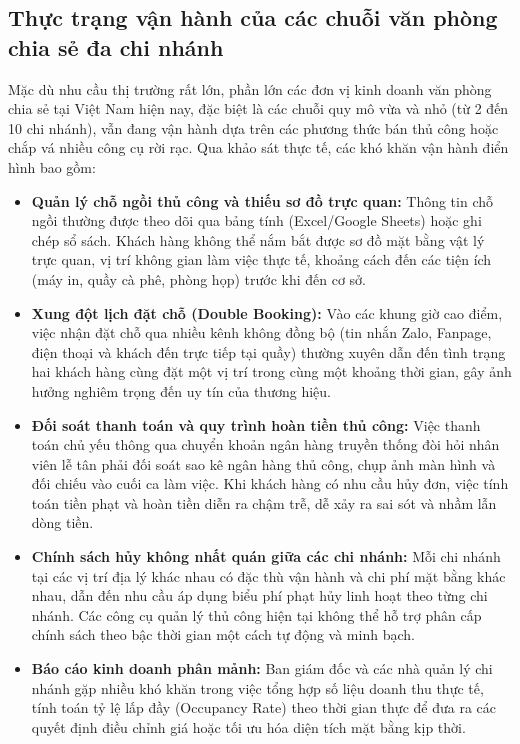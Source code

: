 \subsection{Thực trạng vận hành của các chuỗi văn phòng chia sẻ đa chi nhánh}
Mặc dù nhu cầu thị trường rất lớn, phần lớn các đơn vị kinh doanh văn phòng chia sẻ tại Việt Nam hiện nay, đặc biệt là các chuỗi quy mô vừa và nhỏ (từ 2 đến 10 chi nhánh), vẫn đang vận hành dựa trên các phương thức bán thủ công hoặc chắp vá nhiều công cụ rời rạc. Qua khảo sát thực tế, các khó khăn vận hành điển hình bao gồm:
\begin{itemize}
    \item \textbf{Quản lý chỗ ngồi thủ công và thiếu sơ đồ trực quan:} Thông tin chỗ ngồi thường được theo dõi qua bảng tính (Excel/Google Sheets) hoặc ghi chép sổ sách. Khách hàng không thể nắm bắt được sơ đồ mặt bằng vật lý trực quan, vị trí không gian làm việc thực tế, khoảng cách đến các tiện ích (máy in, quầy cà phê, phòng họp) trước khi đến cơ sở.
    \item \textbf{Xung đột lịch đặt chỗ (Double Booking):} Vào các khung giờ cao điểm, việc nhận đặt chỗ qua nhiều kênh không đồng bộ (tin nhắn Zalo, Fanpage, điện thoại và khách đến trực tiếp tại quầy) thường xuyên dẫn đến tình trạng hai khách hàng cùng đặt một vị trí trong cùng một khoảng thời gian, gây ảnh hưởng nghiêm trọng đến uy tín của thương hiệu.
    \item \textbf{Đối soát thanh toán và quy trình hoàn tiền thủ công:} Việc thanh toán chủ yếu thông qua chuyển khoản ngân hàng truyền thống đòi hỏi nhân viên lễ tân phải đối soát sao kê ngân hàng thủ công, chụp ảnh màn hình và đối chiếu vào cuối ca làm việc. Khi khách hàng có nhu cầu hủy đơn, việc tính toán tiền phạt và hoàn tiền diễn ra chậm trễ, dễ xảy ra sai sót và nhầm lẫn dòng tiền.
    \item \textbf{Chính sách hủy không nhất quán giữa các chi nhánh:} Mỗi chi nhánh tại các vị trí địa lý khác nhau có đặc thù vận hành và chi phí mặt bằng khác nhau, dẫn đến nhu cầu áp dụng biểu phí phạt hủy linh hoạt theo từng chi nhánh. Các công cụ quản lý thủ công hiện tại không thể hỗ trợ phân cấp chính sách theo bậc thời gian một cách tự động và minh bạch.
    \item \textbf{Báo cáo kinh doanh phân mảnh:} Ban giám đốc và các nhà quản lý chi nhánh gặp nhiều khó khăn trong việc tổng hợp số liệu doanh thu thực tế, tính toán tỷ lệ lấp đầy (Occupancy Rate) theo thời gian thực để đưa ra các quyết định điều chỉnh giá hoặc tối ưu hóa diện tích mặt bằng kịp thời.
\end{itemize}

